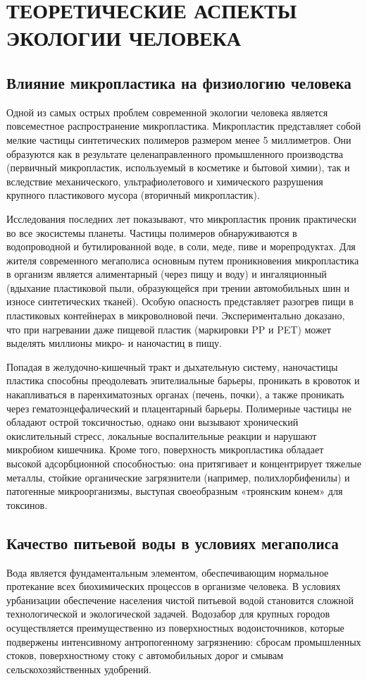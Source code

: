\section{ТЕОРЕТИЧЕСКИЕ АСПЕКТЫ ЭКОЛОГИИ ЧЕЛОВЕКА}

\subsection{Влияние микропластика на физиологию человека}
Одной из самых острых проблем современной экологии человека является повсеместное распространение микропластика. Микропластик представляет собой мелкие частицы синтетических полимеров размером менее 5 миллиметров. Они образуются как в результате целенаправленного промышленного производства (первичный микропластик, используемый в косметике и бытовой химии), так и вследствие механического, ультрафиолетового и химического разрушения крупного пластикового мусора (вторичный микропластик).

Исследования последних лет показывают, что микропластик проник практически во все экосистемы планеты. Частицы полимеров обнаруживаются в водопроводной и бутилированной воде, в соли, меде, пиве и морепродуктах. Для жителя современного мегаполиса основным путем проникновения микропластика в организм является алиментарный (через пищу и воду) и ингаляционный (вдыхание пластиковой пыли, образующейся при трении автомобильных шин и износе синтетических тканей). Особую опасность представляет разогрев пищи в пластиковых контейнерах в микроволновой печи. Экспериментально доказано, что при нагревании даже пищевой пластик (маркировки PP и PET) может выделять миллионы микро- и наночастиц в пищу.

Попадая в желудочно-кишечный тракт и дыхательную систему, наночастицы пластика способны преодолевать эпителиальные барьеры, проникать в кровоток и накапливаться в паренхиматозных органах (печень, почки), а также проникать через гематоэнцефалический и плацентарный барьеры. Полимерные частицы не обладают острой токсичностью, однако они вызывают хронический окислительный стресс, локальные воспалительные реакции и нарушают микробиом кишечника. Кроме того, поверхность микропластика обладает высокой адсорбционной способностью: она притягивает и концентрирует тяжелые металлы, стойкие органические загрязнители (например, полихлорбифенилы) и патогенные микроорганизмы, выступая своеобразным «троянским конем» для токсинов.

\subsection{Качество питьевой воды в условиях мегаполиса}
Вода является фундаментальным элементом, обеспечивающим нормальное протекание всех биохимических процессов в организме человека. В условиях урбанизации обеспечение населения чистой питьевой водой становится сложной технологической и экологической задачей. Водозабор для крупных городов осуществляется преимущественно из поверхностных водоисточников, которые подвержены интенсивному антропогенному загрязнению: сбросам промышленных стоков, поверхностному стоку с автомобильных дорог и смывам сельскохозяйственных удобрений.

